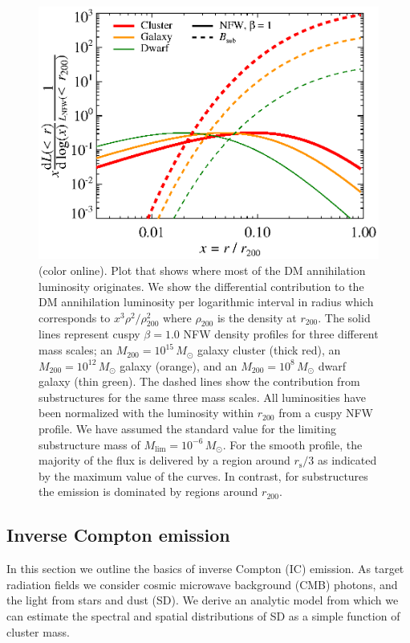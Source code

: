 \documentclass[10pt,aps,pra,reprint,amsmath,amsfonts,amssymb,showpacs,nofootinbib,floatfix]{revtex4-1}
\newcommand{\rmn}{\mathrm}
\newcommand{\msun}{M_\odot}
\newcommand{\s}{\rmn{s}}
\newcommand{\colo}{(color online). }
\newcommand{\rvir}{r_{200}}
\newcommand{\mvir}{M_{200}}
\begin{document}
\begin{figure}
  \includegraphics[width=0.99\columnwidth]{figures/emissiv.sub.bw.eps}
  \caption{\colo Plot that shows where most of the DM
    annihilation luminosity originates. We show the differential
    contribution to the DM annihilation luminosity per logarithmic
    interval in radius which corresponds to $x^3\rho^2/\rho^2_{200}$
    where $\rho_{200}$ is the density at $\rvir$. The solid lines
    represent cuspy $\beta=1.0$ NFW density profiles for three
    different mass scales; an $\mvir=10^{15}\,\msun$ galaxy cluster
    (thick red), an $\mvir=10^{12}\,\msun$ galaxy (orange), and an
    $\mvir=10^{8}\,\msun$ dwarf galaxy (thin green). The dashed lines
    show the contribution from substructures for the same three mass
    scales. All luminosities have been normalized with the luminosity
    within $\rvir$ from a cuspy NFW profile. We have assumed the
    standard value for the limiting substructure mass of
    $M_\rmn{lim}=10^{-6}\,\msun$. For the smooth profile, the majority
    of the flux is delivered by a region around $r_\s/3$ as indicated
    by the maximum value of the curves. In contrast, for substructures
    the emission is dominated by regions around $r_{200}$.}
  \label{fig:radial_emis}
\end{figure}


\subsection{Inverse Compton emission}
\label{sect:IC}

In this section we outline the basics of inverse Compton (IC)
emission. As target radiation fields we consider cosmic microwave
background (CMB) photons, and the light from stars and dust (SD). We
derive an analytic model from which we can estimate the spectral
and spatial distributions of SD as a simple function of cluster mass.
\end{document}
